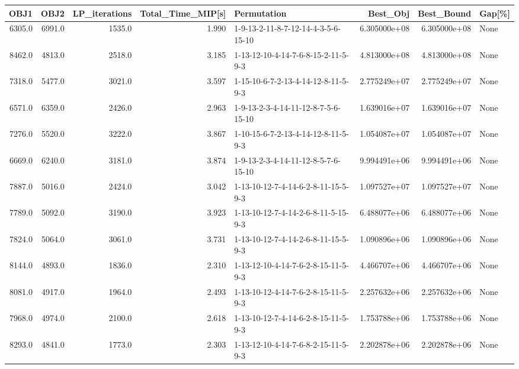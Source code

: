 \begin{tabular}{rrrrlrrl}
\toprule
   OBJ1 &    OBJ2 &  LP\_iterations &  Total\_Time\_MIP[s] &                          Permutation &      Best\_Obj &    Best\_Bound & Gap[\%] \\
\midrule
 6305.0 &  6991.0 &         1535.0 &              1.990 &  1-9-13-2-11-8-7-12-14-4-3-5-6-15-10 &  6.305000e+08 &  6.305000e+08 &   None \\
 8462.0 &  4813.0 &         2518.0 &              3.185 &  1-13-12-10-4-14-7-6-8-15-2-11-5-9-3 &  4.813000e+08 &  4.813000e+08 &   None \\
 7318.0 &  5477.0 &         3021.0 &              3.597 &  1-15-10-6-7-2-13-4-14-12-8-11-5-9-3 &  2.775249e+07 &  2.775249e+07 &   None \\
 6571.0 &  6359.0 &         2426.0 &              2.963 &  1-9-13-2-3-4-14-11-12-8-7-5-6-15-10 &  1.639016e+07 &  1.639016e+07 &   None \\
 7276.0 &  5520.0 &         3222.0 &              3.867 &  1-10-15-6-7-2-13-4-14-12-8-11-5-9-3 &  1.054087e+07 &  1.054087e+07 &   None \\
 6669.0 &  6240.0 &         3181.0 &              3.874 &  1-9-13-2-3-4-14-11-12-8-5-7-6-15-10 &  9.994491e+06 &  9.994491e+06 &   None \\
 7887.0 &  5016.0 &         2424.0 &              3.042 &  1-13-10-12-7-4-14-6-2-8-11-15-5-9-3 &  1.097527e+07 &  1.097527e+07 &   None \\
 7789.0 &  5092.0 &         3190.0 &              3.923 &  1-13-10-12-7-4-14-2-6-8-11-5-15-9-3 &  6.488077e+06 &  6.488077e+06 &   None \\
 7824.0 &  5064.0 &         3061.0 &              3.731 &  1-13-10-12-7-4-14-2-6-8-11-15-5-9-3 &  1.090896e+06 &  1.090896e+06 &   None \\
 8144.0 &  4893.0 &         1836.0 &              2.310 &  1-13-12-10-4-14-7-6-2-8-15-11-5-9-3 &  4.466707e+06 &  4.466707e+06 &   None \\
 8081.0 &  4917.0 &         1964.0 &              2.493 &  1-13-10-12-4-14-7-6-2-8-15-11-5-9-3 &  2.257632e+06 &  2.257632e+06 &   None \\
 7968.0 &  4974.0 &         2100.0 &              2.618 &  1-13-10-12-7-4-14-6-2-8-15-11-5-9-3 &  1.753788e+06 &  1.753788e+06 &   None \\
 8293.0 &  4841.0 &         1773.0 &              2.303 &  1-13-12-10-4-14-7-6-8-2-15-11-5-9-3 &  2.202878e+06 &  2.202878e+06 &   None \\
\bottomrule
\end{tabular}
